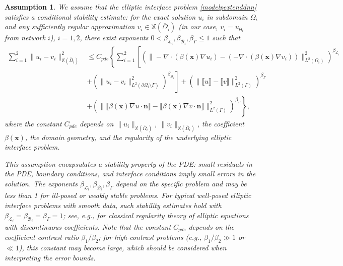 \documentclass{article}
\newtheorem{assumption}{Assumption}[section]
\begin{document}
\begin{assumption}\label{e1}
We assume that the elliptic interface problem \eqref{modelpextenddnn} satisfies a \emph{conditional stability estimate}: for the exact solution $u_i$ in subdomain $\Omega_i$ and any sufficiently regular approximation $v_i \in \mathbb{X}(\overline{\Omega}_i)$ (in our case, $v_i = u_{\boldsymbol{\theta}_i}$ from network $i$), $i = 1, 2$, there exist exponents $0 < \beta_{\mathcal{L}_i}, \beta_{\mathcal{B}_i}, \beta_{\Gamma} \leq 1$ such that
\begin{equation}
\begin{aligned}
    \sum_{i=1}^{2} \|u_i - v_i\|^2_{\mathbb{X}(\overline{\Omega}_i)} &\leq C_{pde} \left\{ \sum_{i=1}^{2} \left[ \left(\|-\nabla \cdot (\beta(\boldsymbol{x})\nabla u_i) - (-\nabla \cdot (\beta(\boldsymbol{x})\nabla v_i))\|^2_{L^2(\Omega_i)}\right)^{\beta_{\mathcal{L}_i}} \right. \right.\\
&\left. + \left(\|u_i - v_i\|^2_{L^2(\partial\Omega_i \setminus \Gamma)}\right)^{\beta_{\mathcal{B}_i}}  \right] + \left(\|\llbracket u \rrbracket - \llbracket v \rrbracket\|^2_{L^2(\Gamma)}\right)^{\beta_{\Gamma}}\\
&\left.  + \left(\|\llbracket \beta(\boldsymbol{x}) \nabla u \cdot \boldsymbol{n} \rrbracket - \llbracket \beta(\boldsymbol{x}) \nabla v \cdot \boldsymbol{n} \rrbracket\|^2_{L^2(\Gamma)}\right)^{\beta_{\Gamma}} \right\},
\end{aligned}
\end{equation}
where the constant $C_{pde}$ depends on $\|u_i\|_{\mathbb{X}(\overline{\Omega}_i)}$, $\|v_i\|_{\mathbb{X}(\overline{\Omega}_i)}$, the coefficient $\beta(\boldsymbol{x})$, the domain geometry, and the regularity of the underlying elliptic interface problem.

This assumption encapsulates a stability property of the PDE: small residuals in the PDE, boundary conditions, and interface conditions imply small errors in the solution. The exponents $\beta_{\mathcal{L}_i}, \beta_{\mathcal{B}_i}, \beta_{\Gamma}$ depend on the specific problem and may be less than 1 for ill-posed or weakly stable problems. For typical well-posed elliptic interface problems with smooth data, such stability estimates hold with $\beta_{\mathcal{L}_i} = \beta_{\mathcal{B}_i} = \beta_{\Gamma} = 1$; see, e.g., \cite{gilbarg2001elliptic, chen1998finite} for classical regularity theory of elliptic equations with discontinuous coefficients. Note that the constant $C_{pde}$ depends on the coefficient contrast ratio $\beta_1/\beta_2$; for high-contrast problems (e.g., $\beta_1/\beta_2 \gg 1$ or $\ll 1$), this constant may become large, which should be considered when interpreting the error bounds.
\end{assumption}
\end{document}
